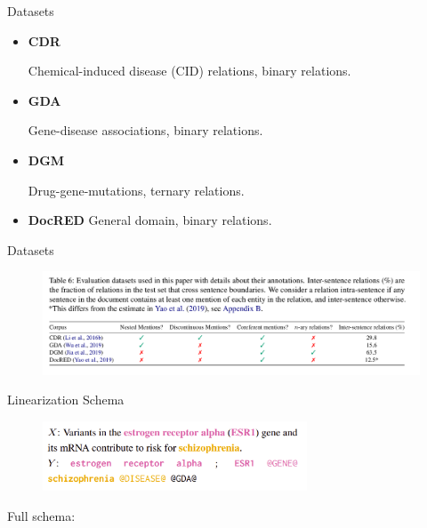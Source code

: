\documentclass[usenames,dvipsnames,pdf]{beamer}
\begin{document}
        \begin{frame}{Datasets}
          \begin{itemize}
          \item \textbf{CDR}


            Chemical-induced disease (CID) relations, binary relations.   
          \item \textbf{GDA}


            Gene-disease associations, binary relations.  
          \item \textbf{DGM}

            Drug-gene-mutations, ternary relations.   
          \item \textbf{DocRED}
            General domain, binary relations.
            
          \end{itemize}
        \end{frame}

        \begin{frame}{Datasets}
          \begin{figure}
            \includegraphics[width=1.0\textwidth,height=1.0\textheight,keepaspectratio]{datasetinfo} 
          \end{figure}
        \end{frame}
       
        
        \begin{frame}{Linearization Schema}
          \begin{figure}
          \includegraphics[width=0.7\textwidth,height=0.7\textheight,keepaspectratio]{linearization} 
          \end{figure}
          Full schema:

          
          \begin{adjustbox}{varwidth=\linewidth}%
            \small{}


            \small{}


            \small{}
            \end{adjustbox}
        \end{frame}
\end{document}
